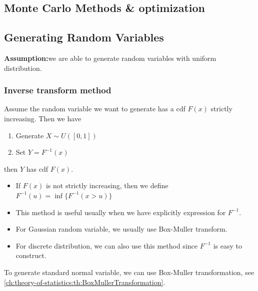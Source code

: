 
\begin{refsection}
\startcontents[chapters]
\chapter{Monte Carlo Methods \& optimization}\label{ch:MonteCarlo-methods--optimization}
	
\section{Generating Random Variables}\label{ch:MonteCarlo-methods--optimization:sec:generateRN}
\begin{mdframed}
	\textbf{Assumption:}we are able to generate random variables with uniform distribution.
\end{mdframed}


\subsection{Inverse transform method}\label{ch:MonteCarlo-methods--optimization:sec:inversetransformrandomnumbergeneration}
\begin{method}
	Assume the random variable we want to generate has a cdf $F(x)$ strictly increasing. Then we have
	\begin{enumerate}
		\item Generate $X\sim U([0,1])$
		\item Set $Y = F^{-1}(x)$
	\end{enumerate}
	then $Y$ has cdf $F(x)$.
\end{method}

\begin{remark}\hfill
	\begin{itemize}
		\item If $F(x)$ is not strictly increasing, then we define $F^{-1}(u) = \inf\{F^{-1}(x > u)\}$
		\item This method is useful usually when we have explicitly expression for $F^{-1}$.
		\item For Gaussian random variable, we usually use Box-Muller transform.
		\item For discrete distribution, we can also use this method since $F^{-1}$ is easy to construct.
	\end{itemize}
\end{remark}


\begin{remark}
To generate standard normal variable, we can use Box-Muller transformation, see \autoref{ch:theory-of-statistics:th:BoxMullerTransformation}.	
\end{remark}


\end{refsection}
